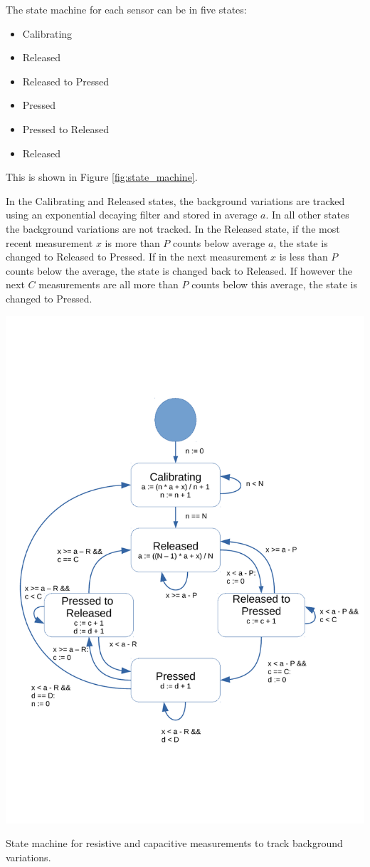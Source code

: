 \documentclass{sigchi-ext}
\begin{document}
The state machine for each sensor can be in five states:
\begin{itemize}
\item Calibrating
\item Released
\item Released to Pressed
\item Pressed
\item Pressed to Released
\item Released
\end{itemize}
This is shown in Figure \ref{fig:state_machine}.

In the Calibrating and Released states, the background variations are tracked
using an exponential decaying filter and stored in average $a$. In all other
states the background variations are not tracked. In the Released state, if the
most recent measurement $x$ is more than $P$ counts below average $a$, the state
is changed to Released to Pressed. If in the next measurement $x$ is less
than $P$ counts below the average, the state is changed back to Released. If
however the next $C$ measurements are all more than $P$ counts below this
average, the state is changed to Pressed.

\begin{marginfigure}
\begin{minipage}{\marginparwidth}
\centering
\includegraphics[width=0.9\columnwidth]{figures/state_machine}
 \caption{State machine for resistive and capacitive measurements to track
background variations.}~\label{fig:state_machine}
\end{minipage}
\end{marginfigure}
\end{document}
